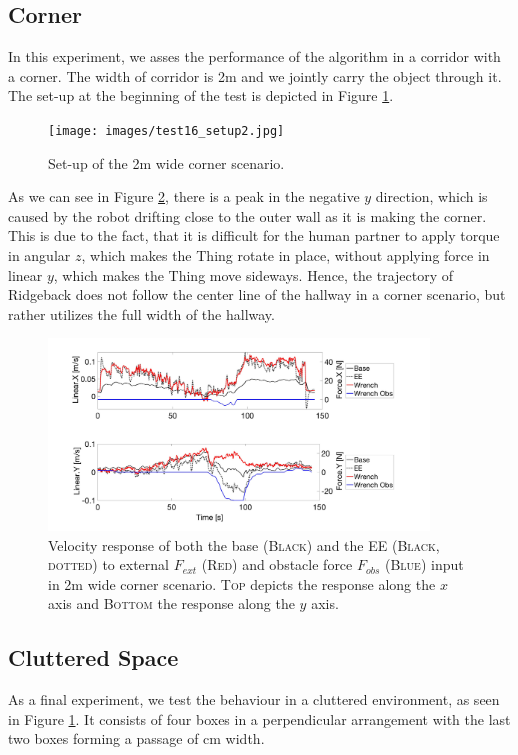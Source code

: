\subsection{Corner}
In this experiment, we asses the performance of the algorithm in a corridor with a corner. The width of corridor is \unit{2}{m} and we jointly carry the object through it. The set-up at the beginning of the test is depicted in Figure \ref{pics:test16_setup}.

\begin{figure}[h]
   \centering
   \texttt{[image: images/test16\_setup2.jpg]}
   \caption{Set-up of the \unit{2}{m} wide corner scenario.}
   \label{pics:test16_setup}
\end{figure}

As we can see in Figure \ref{pics:test16}, there is a peak in the negative $y$ direction, which is caused by the robot drifting close to the outer wall as it is making the corner. This is due to the fact, that it is difficult for the human partner to apply torque in angular $z$, which makes the Thing rotate in place, without applying force in linear $y$, which makes the Thing move sideways. Hence, the trajectory of Ridgeback does not follow the center line of the hallway in a corner scenario, but rather utilizes the full width of the hallway.

\begin{figure}
   \centering
   \includegraphics[width=0.9\textwidth]{images/test16.jpg}
   \caption{Velocity response of both the base (\textsc{Black}) and the EE (\textsc{Black, dotted}) to external $F_{ext }$ (\textsc{Red}) and obstacle force $F_{obs}$ (\textsc{Blue}) input in \unit{2}{m} wide corner scenario. \textsc{Top} depicts the response along the $x$ axis and \textsc{Bottom} the response along the $y$ axis.}
   \label{pics:test16}
\end{figure}

\subsection{Cluttered Space}
As a final experiment, we test the behaviour in a cluttered environment, as seen in Figure \ref{pics:test16_setup}. It consists of four boxes in a perpendicular arrangement with the last two boxes forming a passage of \unit[120]{cm} width.

